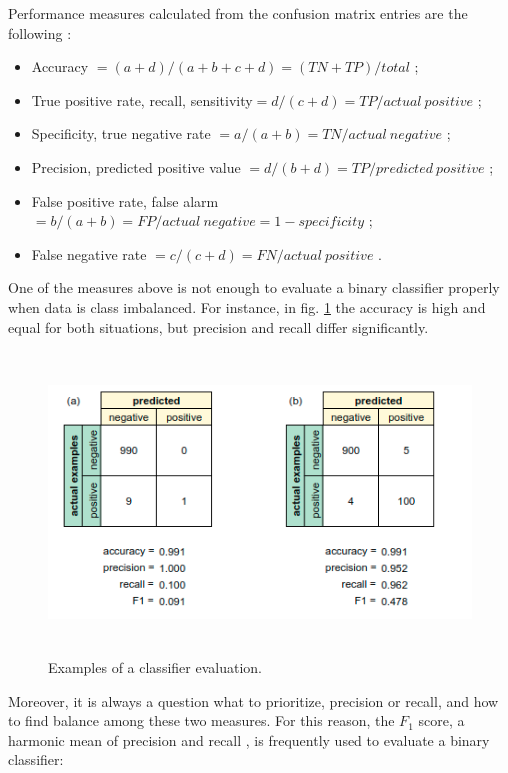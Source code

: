 Performance measures calculated from the confusion matrix entries are
the following \citep{Sebastiani2002}:
\begin{itemize}
    \item Accuracy $= (a + d)/(a + b + c + d) =
    (TN + TP)/total$ ;
    \item True positive rate, recall, sensitivity$ =
    d/(c + d) = TP/actual\: positive$ ;
    \item Specificity, true negative rate $= a/(a + b) =
    TN/actual\: negative$ ; 
    \item Precision, predicted positive value $=
    d/(b + d) = TP/predicted\: positive$ ;
    \item False positive rate, false alarm $= b/(a + b)
    = FP/actual\: negative = 1 - specificity$ ;
    \item False negative rate $= c/(c + d) = FN/actual\: positive$ .
\end{itemize}

One of the measures above is not enough to evaluate a binary classifier properly when data is class imbalanced. For instance, in fig. \ref{fig:classifiers-evaluation} the accuracy is high and equal for both situations, but precision and recall differ significantly. 

\begin{figure}[h]
    \centering
    \includegraphics[height=8cm]{Images/Classifiers-evaluation.png}
    \caption{Examples of a classifier evaluation.}
    \label{fig:classifiers-evaluation}
\end{figure}

Moreover, it is always a question what to prioritize, precision or recall, and how to find balance among these two measures. For this reason, the $F_1$ score, a harmonic mean of precision and recall \citep{Chinchor-1992}, is frequently used to evaluate a binary classifier:

